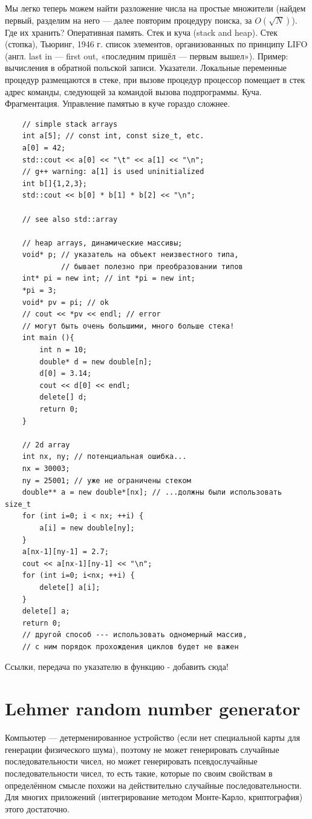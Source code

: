 \documentclass{book}
\begin{document}
Мы легко теперь можем найти разложение числа на простые множители (найдем первый, разделим на него
--- далее повторим процедуру поиска, за $O(\sqrt{N})$). Где их хранить? Оперативная память. Стек и
куча (stack and heap). Стек (стопка), Тьюринг, 1946 г. список элементов, организованных по принципу LIFO
(англ. last in — first out, «последним пришёл — первым вышел»). Пример: вычисления в обратной
польской записи. Указатели. Локальные переменные
процедур размещаются в стеке, при вызове процедур процессор помещает в стек адрес команды,
следующей за командой вызова подпрограммы. Куча. Фрагментация. Управление памятью в куче гораздо сложнее.

\begin{verbatim}
    // simple stack arrays
    int a[5]; // const int, const size_t, etc.
    a[0] = 42;
    std::cout << a[0] << "\t" << a[1] << "\n";
    // g++ warning: a[1] is used uninitialized
    int b[]{1,2,3};
    std::cout << b[0] * b[1] * b[2] << "\n";

    // see also std::array

    // heap arrays, динамические массивы;
    void* p; // указатель на объект неизвестного типа,
             // бывает полезно при преобразовании типов
    int* pi = new int; // int *pi = new int;
    *pi = 3;
    void* pv = pi; // ok
    // cout << *pv << endl; // error
    // могут быть очень большими, много больше стека!
    int main (){
        int n = 10;
        double* d = new double[n];
        d[0] = 3.14;
        cout << d[0] << endl;
        delete[] d;
        return 0;
    }

    // 2d array
    int nx, ny; // потенциальная ошибка...
    nx = 30003;
    ny = 25001; // уже не ограничены стеком
    double** a = new double*[nx]; // ...должны были использовать size_t
    for (int i=0; i < nx; ++i) {
        a[i] = new double[ny];
    }
    a[nx-1][ny-1] = 2.7;
    cout << a[nx-1][ny-1] << "\n";
    for (int i=0; i<nx; ++i) {
        delete[] a[i];
    }
    delete[] a;
    return 0;
    // другой способ --- использовать одномерный массив,
    // с ним порядок прохождения циклов будет не важен
\end{verbatim}

Ссылки, передача по указателю в функцию - добавить сюда!

\section{Lehmer random number generator}

Компьютер --- детерменированное устройство (если нет специальной карты для генерации физического
шума), поэтому не может генерировать случайные последовательности чисел, но может генерировать
псевдослучайные последовательности чисел, то есть такие, которые по своим свойствам в определённом
смысле похожи на действительно случайные последовательности. Для многих приложений (интегрирование
методом Монте-Карло, криптография) этого достаточно.
\end{document}
